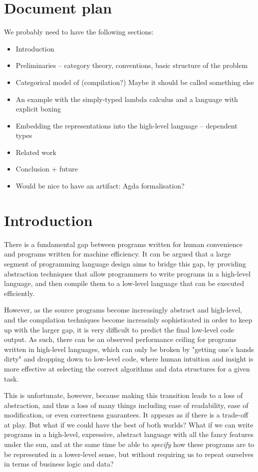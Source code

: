 \section{Document plan}

We probably need to have the following sections:

\begin{itemize}
  \item Introduction
  \item Preliminaries -- category theory, conventions, basic structure of the problem
  \item Categorical model of (compilation?) Maybe it should be called something else
  \item An example with the simply-typed lambda calculus and a language with explicit
        boxing
  \item Embedding the representations into the high-level language -- dependent types
  \item Related work
  \item Conclusion + future
  \item Would be nice to have an artifact: Agda formalisation?
\end{itemize}

\section{Introduction}

There is a fundamental gap between programs written for human convenience and
programs written for machine efficiency. It can be argued that a large segment
of programming language design aims to bridge this gap, by providing
abstraction techniques that allow programmers to write programs in a high-level
language, and then compile them to a low-level language that can be executed
efficiently.

However, as the source programs become increasingly abstract and high-level,
and the compilation techniques become increasinly sophisticated in order to
keep up with the larger gap, it is very difficult to predict the final
low-level code output. As such, there can be an observed performance ceiling
for programs written in high-level languages, which can only be broken by
"getting one's hands dirty" and dropping down to low-level code, where human
intuition and insight is more effective at selecting the correct algorithms and
data structures for a given task.

This is unfortunate, however, because making this transition leads to a loss of
abstraction, and thus a loss of many things including ease of readability, ease
of modification, or even correctness guarantees. It appears as if there is a
trade-off at play. But what if we could have the best of both worlds? What if
we can write programs in a high-level, expressive, abstract language with all
the fancy features under the sun, and at the same time be able to
\emph{specify} how these programs are to be represented in a lower-level sense,
but without requiring us to repeat ourselves in terms of business logic and
data?

